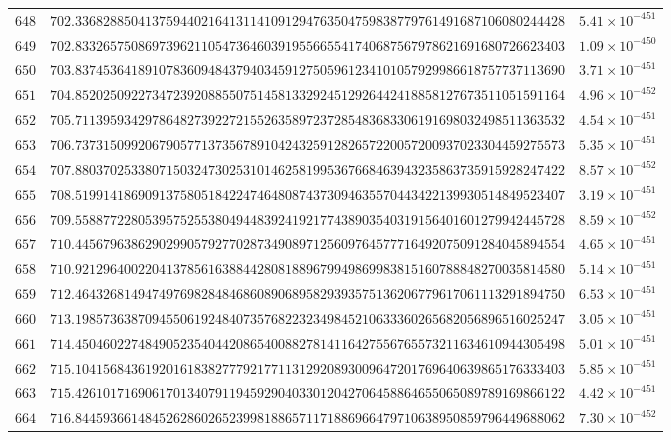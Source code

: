 \documentclass[12pt,reqno]{amsart}
\theoremstyle{remark}
\begin{document}
\begin{longtable}{clc}
$648$ & $702.3368288504137594402164131141091294763504759838779761491687106080244428$ & $5.41\times 10^{-451}$ \\
$649$ & $702.8332657508697396211054736460391955665541740687567978621691680726623403$ & $1.09\times 10^{-450}$ \\
$650$ & $703.8374536418910783609484379403459127505961234101057929986618757737113690$ & $3.71\times 10^{-451}$ \\
$651$ & $704.8520250922734723920885507514581332924512926442418858127673511051591164$ & $4.96\times 10^{-452}$ \\
$652$ & $705.7113959342978648273922721552635897237285483683306191698032498511363532$ & $4.54\times 10^{-451}$ \\
$653$ & $706.7373150992067905771373567891042432591282657220057200937023304459275573$ & $5.35\times 10^{-451}$ \\
$654$ & $707.8803702533807150324730253101462581995367668463943235863735915928247422$ & $8.57\times 10^{-452}$ \\
$655$ & $708.5199141869091375805184224746480874373094635570443422139930514849523407$ & $3.19\times 10^{-451}$ \\
$656$ & $709.5588772280539575255380494483924192177438903540319156401601279942445728$ & $8.59\times 10^{-452}$ \\
$657$ & $710.4456796386290299057927702873490897125609764577716492075091284045894554$ & $4.65\times 10^{-451}$ \\
$658$ & $710.9212964002204137856163884428081889679949869983815160788848270035814580$ & $5.14\times 10^{-451}$ \\
$659$ & $712.4643268149474976982848468608906895829393575136206779617061113291894750$ & $6.53\times 10^{-451}$ \\
$660$ & $713.1985736387094550619248407357682232349845210633360265682056896516025247$ & $3.05\times 10^{-451}$ \\
$661$ & $714.4504602274849052354044208654008827814116427556765573211634610944305498$ & $5.01\times 10^{-451}$ \\
$662$ & $715.1041568436192016183827779217711312920893009647201769640639865176333403$ & $5.85\times 10^{-451}$ \\
$663$ & $715.4261017169061701340791194592904033012042706458864655065089789169866122$ & $4.42\times 10^{-451}$ \\
$664$ & $716.8445936614845262860265239981886571171886966479710638950859796449688062$ & $7.30\times 10^{-452}$ \\

\end{longtable}
\end{document}
